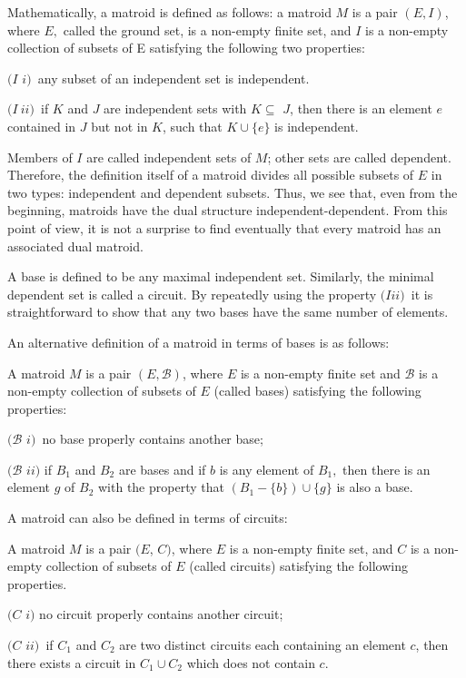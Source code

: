 \documentclass[a4paper,12pt]{article}
\begin{document}
Mathematically, a matroid is defined as follows: a matroid $M$ is a pair $%
(E,I)$, where $E,$ called the ground set, is a non-empty finite set, and $I$
is a non-empty collection of subsets of E satisfying the following two
properties:

$(I$ $\mathit{i)}$\textit{\ }any subset of an independent set is independent.

$(I\mathit{\ ii)}$\textit{\ }if $K$ and $J$ are independent sets with $%
K\subseteq $ $J$, then there is an element $e$ contained in $J$ but not in $%
K $, such that $K\cup \{e\}$ is independent.

Members of $I$ are called independent sets of $M$; other sets are called
dependent. Therefore, the definition itself of a matroid divides all
possible subsets of $E$ in two types: independent and dependent subsets.
Thus, we see that, even from the beginning, matroids have the dual structure
independent-dependent. From this point of view, it is not a surprise to find
eventually that every matroid has an associated dual matroid.

A base is defined to be any maximal independent set. Similarly, the minimal
dependent set is called a circuit. By repeatedly using the property $(I%
\mathit{ii)}$\textit{\ }it is straightforward to show that any two bases
have the same number of elements.

An alternative definition of a matroid in terms of bases is as follows:

A matroid $M$ is a pair $(E,\mathcal{B})$, where $E$ is a non-empty finite
set and $\mathcal{B}$ is a non-empty collection of subsets of $E$ (called
bases) satisfying the following properties:

$(\mathcal{B}$ $\mathit{i)}$\textit{\ }no base properly contains another
base;

$(\mathcal{B}$ $\mathit{ii)}$ if $B_{1}$ and $B_{2}$ are bases and if $b$ is
any element of $B_{1},$ then there is an element $g$ of $B_{2}$ with the
property that $(B_{1}-\{b\})\cup \{g\}$ is also a base.

A matroid can also be defined in terms of circuits:

A matroid $M$ is a pair $(E$, $C)$, where $E$ is a non-empty finite set, and 
$C$ is a non-empty collection of subsets of $E$ (called circuits) satisfying
the following properties.

$(C$ $\mathit{i})$ no circuit properly contains another circuit;

$(C$ $\mathit{ii)}$\textit{\ }if $C_{1}$ and $C_{2}$ are two distinct
circuits each containing an element $c$, then there exists a circuit in $%
C_{1}\cup C_{2}$ which does not contain $c$.
\end{document}
